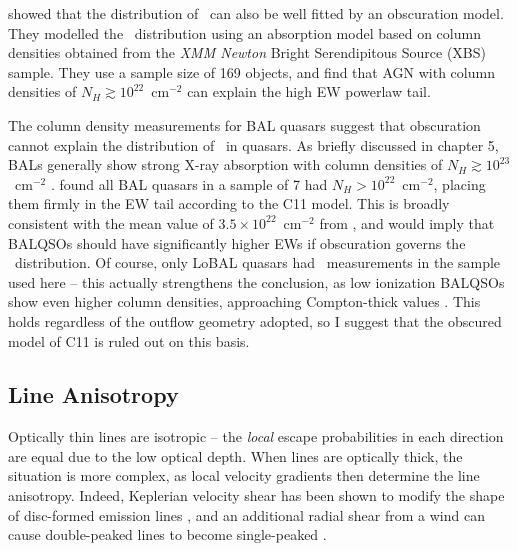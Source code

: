 \citet[][hereafter C11]{caccianiga2011} showed that the distribution of \ewo\
can also be well fitted by an obscuration model. They modelled the 
\ewo\ distribution using an absorption model based on column densities
obtained from the {\sl XMM Newton} Bright Serendipitous Source (XBS)
sample. They use a sample size of 169 objects, and find that AGN with 
column densities of $N_H\gtrsim10^{22}$~cm$^{-2}$ can explain the high
EW powerlaw tail. 

The column density measurements for BAL quasars suggest that obscuration 
cannot explain the distribution of \ewo\ in quasars. 
As briefly discussed in chapter 5, BALs generally show
strong X-ray absorption with column densities of $N_H\gtrsim10^{23}$~cm$^{-2}$
\citep{green1996,mathur2000,green2001,grupemathur2003}. \cite{gallagher1999}
found all BAL quasars in a sample of 7 had $N_H>10^{22}$~cm$^{-2}$, placing
them firmly in the EW tail according to the C11 model. This is broadly
consistent with the mean value of $3.5\times10^{22}$~cm$^{-2}$ from
\cite{morabito2013}, and would imply that BALQSOs should have significantly
higher EWs if obscuration governs the \ewo\ distribution.
Of course, only LoBAL quasars had \ewo\ measurements 
in the sample used here -- this actually strengthens the conclusion, as low ionization 
BALQSOs show even higher column densities, approaching Compton-thick values 
\citep{morabito2011}. This holds regardless of the outflow geometry adopted,
so I suggest that the obscured model of C11 is ruled out on this basis.


\subsection{Line Anisotropy}
\label{sec:line_aniso}

Optically thin lines are isotropic -- the {\em local}
escape probabilities in each direction are equal due to the 
low optical depth. When lines are optically thick, the situation is more
complex, as local velocity gradients then determine the line 
anisotropy. Indeed, Keplerian velocity shear has been shown to modify the
shape of disc-formed emission lines \citep{hornemarsh1986}, and an additional
radial shear from a wind can cause double-peaked lines
to become single-peaked \citep{MC96,MC97,flohic2012}.

